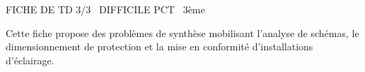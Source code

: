 \documentclass[11pt]{article}
\begin{document}
\begin{tcolorbox}[enhanced,colback=popink,colframe=popink,arc=10pt,boxrule=0pt,left=12pt,right=12pt,top=9pt,bottom=9pt]
{\color{white}\popxbold\small FICHE DE TD 3/3 \textbullet\ DIFFICILE \hfill PCT \textbullet\ 3ème\par}
\end{tcolorbox}
\vspace{4pt}
Cette fiche propose des problèmes de synthèse mobilisant l'analyse de schémas, le dimensionnement de protection et la mise en conformité d'installations d'éclairage.
\end{document}
